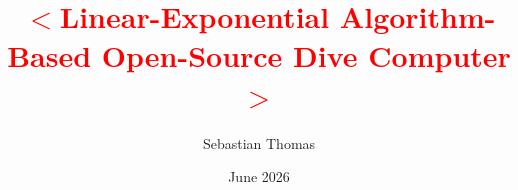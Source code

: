 \newcommand{\shell}[1]{\texttt{#1}}

\newenvironment{shellenv}%
{\VerbatimEnvironment%
 \begin{Sbox}\begin{minipage}{0.97\textwidth}\begin{Verbatim}%
}%
{\end{Verbatim}\end{minipage}\end{Sbox}%
\setlength{\fboxsep}{6pt}\shadowbox{\TheSbox}}%

\newcommand{\file}[1]{\texttt{#1}}

\newcommand{\parameter}[1]{$<$#1$>$}

\newtheorem{definition}{Definition}

\newcommand{\misspar}[1]{\textcolor{red}{\textbf{$<$#1$>$}}}

\makeatletter

\title{\misspar{Linear-Exponential Algorithm-Based Open-Source Dive Computer}}%
\author{Sebastian Thomas}%
\date{June 2026}%

\def\@semester{Spring Semester 2026}%
\newcommand{\setsemester}[1]{\def\@semester{#1}}%
\let\semester\setsemester%
\newcommand{\show@semester}{\@semester}%

\def\@reporttype{Bachelor Thesis}%
\newcommand{\setreporttype}[1]{\def\@reporttype{#1}}%
\let\reporttype\setreporttype%
\newcommand{\show@reporttype}{\@reporttype}%

